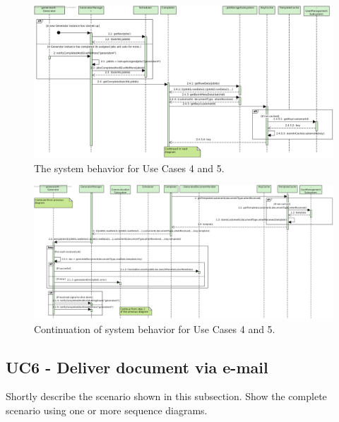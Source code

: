 \begin{figure}[!htp]
    \centering
    \includegraphics[width=\textwidth]{figures/UC4_5 - ProcessJobs1.png}
    \caption{The system behavior for Use Cases 4 and 5.
        }\label{fig:seq_uc45_1}
\end{figure}

\begin{figure}[!htp]
    \centering
    \includegraphics[width=\textwidth]{figures/UC4_5 - ProcessJobs2.png}
    \caption{Continuation of system behavior for Use Cases 4 and 5.
        }\label{fig:seq_uc45_2}
\end{figure}

\subsection{UC6 - Deliver document via e-mail}
Shortly describe the scenario shown in this subsection.
Show the complete scenario using one or more sequence diagrams.

